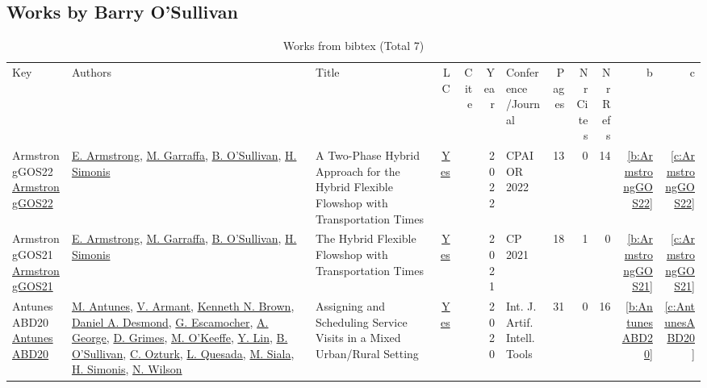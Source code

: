 \subsection{Works by Barry O'Sullivan}
\label{sec:a16}
{\scriptsize
\begin{longtable}{>{\raggedright\arraybackslash}p{3cm}>{\raggedright\arraybackslash}p{6cm}>{\raggedright\arraybackslash}p{6.5cm}rrrp{2.5cm}rrrrr}
\rowcolor{white}\caption{Works from bibtex (Total 7)}\\ \toprule
\rowcolor{white}Key & Authors & Title & LC & Cite & Year & \shortstack{Conference\\/Journal} & Pages & \shortstack{Nr\\Cites} & \shortstack{Nr\\Refs} & b & c \\ \midrule\endhead
\bottomrule
\endfoot
ArmstrongGOS22 \href{https://doi.org/10.1007/978-3-031-08011-1\_1}{ArmstrongGOS22} & \hyperref[auth:a14]{E. Armstrong}, \hyperref[auth:a15]{M. Garraffa}, \hyperref[auth:a16]{B. O'Sullivan}, \hyperref[auth:a17]{H. Simonis} & A Two-Phase Hybrid Approach for the Hybrid Flexible Flowshop with Transportation Times & \href{works/ArmstrongGOS22.pdf}{Yes} & \cite{ArmstrongGOS22} & 2022 & CPAIOR 2022 & 13 & 0 & 14 & \ref{b:ArmstrongGOS22} & \ref{c:ArmstrongGOS22}\\
ArmstrongGOS21 \href{https://doi.org/10.4230/LIPIcs.CP.2021.16}{ArmstrongGOS21} & \hyperref[auth:a14]{E. Armstrong}, \hyperref[auth:a15]{M. Garraffa}, \hyperref[auth:a16]{B. O'Sullivan}, \hyperref[auth:a17]{H. Simonis} & The Hybrid Flexible Flowshop with Transportation Times & \href{works/ArmstrongGOS21.pdf}{Yes} & \cite{ArmstrongGOS21} & 2021 & CP 2021 & 18 & 1 & 0 & \ref{b:ArmstrongGOS21} & \ref{c:ArmstrongGOS21}\\
AntunesABD20 \href{https://doi.org/10.1142/S0218213020600076}{AntunesABD20} & \hyperref[auth:a891]{M. Antunes}, \hyperref[auth:a892]{V. Armant}, \hyperref[auth:a223]{Kenneth N. Brown}, \hyperref[auth:a893]{Daniel A. Desmond}, \hyperref[auth:a894]{G. Escamocher}, \hyperref[auth:a895]{A. George}, \hyperref[auth:a183]{D. Grimes}, \hyperref[auth:a896]{M. O'Keeffe}, \hyperref[auth:a897]{Y. Lin}, \hyperref[auth:a16]{B. O'Sullivan}, \hyperref[auth:a898]{C. Ozturk}, \hyperref[auth:a899]{L. Quesada}, \hyperref[auth:a130]{M. Siala}, \hyperref[auth:a17]{H. Simonis}, \hyperref[auth:a838]{N. Wilson} & Assigning and Scheduling Service Visits in a Mixed Urban/Rural Setting & \href{works/AntunesABD20.pdf}{Yes} & \cite{AntunesABD20} & 2020 & Int. J. Artif. Intell. Tools & 31 & 0 & 16 & \ref{b:AntunesABD20} & \ref{c:AntunesABD20}\\

\end{longtable}}
